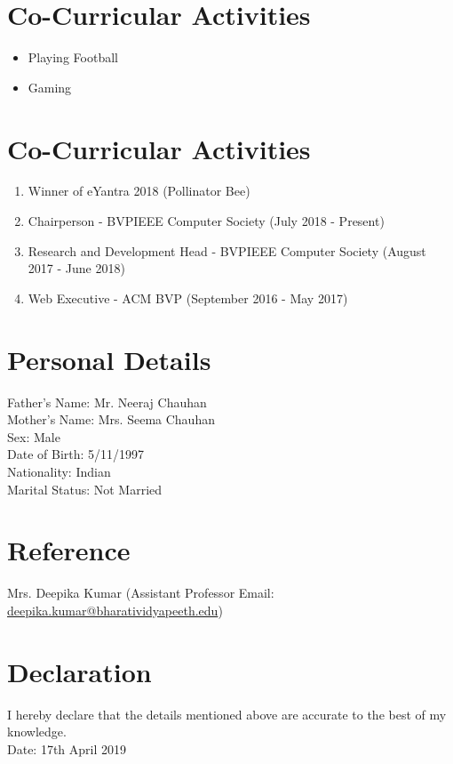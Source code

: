 \documentclass{article}
\begin{document}
\section{Co-Curricular Activities}

\begin{itemize}
\item Playing Football
\item Gaming 
\end{itemize}

\section{Co-Curricular Activities}

\begin{enumerate}
\item Winner of eYantra 2018 (Pollinator Bee)
\item Chairperson - BVPIEEE Computer Society (July 2018 - Present)
\item Research and Development Head - BVPIEEE Computer Society (August 2017 - June 2018)
\item Web Executive - ACM BVP (September 2016 - May 2017)
\end{enumerate}

\section{Personal Details}
Father's Name: Mr. Neeraj Chauhan
\\ Mother's Name: Mrs. Seema Chauhan
\\ Sex: Male
\\ Date of Birth: 5/11/1997
\\ Nationality: Indian
\\ Marital Status: Not Married

\section{Reference}
Mrs. Deepika Kumar (Assistant Professor Email: \href{mailto:deepika.kumar@bharatividyapeeth.edu}{deepika.kumar@bharatividyapeeth.edu})

\section{Declaration}
I hereby declare that the details mentioned above are accurate to the best of my knowledge.
\\Date: 17th April 2019
\end{document}
